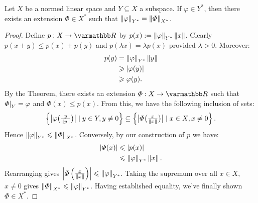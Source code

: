 \begin{corollary}\label{cor:bdd-lin-funct-extension}
    Let $X$ be a normed linear space and $Y\subseteq X$ a subspace. If $\varphi \in Y^\ast$, then there exists an extension $\varPhi \in X^\ast$ such that $\left\lVert \varphi \right\rVert_{Y^\ast} = \left\lVert \varPhi \right\rVert_{X^\ast}$. 
\end{corollary}
    \begin{proof}
        Define $p:X \rightarrow \bfR$ by $p(x) := \left\lVert \varphi \right\rVert_{Y^\ast} \left\lVert x \right\rVert$. Clearly $p(x+y) \leq p(x) + p(y)$ and $p(\lambda x) = \lambda p(x)$ provided $\lambda > 0$. Moreover:
            \begin{equation*}
            \begin{split}
                p(y) 
                & = \left\lVert \varphi \right\rVert_{Y^\ast}\left\lVert y \right\rVert \\
                & \geqslant |\varphi(y)| \\
                & \geqslant \varphi(y).
            \end{split}
            \end{equation*}
        By the  Theorem, there exists an extension $\varPhi:X \rightarrow \bfR$ such that $\restr{\varPhi}{Y} = \varphi$ and $\varPhi(x) \leq p(x)$. From this, we have the following inclusion of sets:
            \begin{equation*}
            \begin{split}
                \left\{ \bigl| \varphi \bigl( \textstyle \frac{y}{\left\lVert y \right\rVert} \bigr) \bigr| \mid y \in Y, y \neq 0 \right\} \subseteq \left\{ \bigl| \varPhi \bigl( \textstyle \frac{x}{\left\lVert x \right\rVert} \bigr) \bigr| \mid x \in X, x \neq 0 \right\}.
            \end{split}
            \end{equation*}
        Hence $\left\lVert \varphi \right\rVert_{Y^\ast} \leqslant \left\lVert \varPhi \right\rVert_{X^\ast}$. Conversely, by our construction of $p$ we have:
            \begin{equation*}
            \begin{split}
                |\varPhi(x)|
                & \leqslant |p(x)| \\
                & \leqslant \left\lVert \varphi \right\rVert_{Y^\ast} \left\lVert x \right\rVert.
            \end{split}
            \end{equation*}
        Rearranging gives $\left| \varPhi \left( \frac{x}{\left\lVert x \right\rVert} \right) \right| \leqslant \left\lVert \varphi \right\rVert_{Y^\ast}$. Taking the supremum over all $x \in X$, $x \neq 0$ gives $\left\lVert \varPhi \right\rVert_{X^\ast} \leqslant \left\lVert \varphi \right\rVert_{Y^\ast}$. Having established equality, we've finally shown $\varPhi \in X^\ast$.
    \end{proof}

